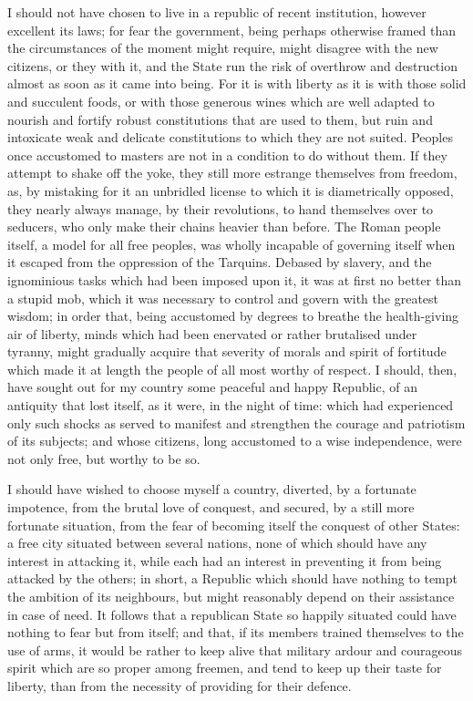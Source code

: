 \documentclass[12pt]{report}
\begin{document}
I should not have chosen to live in a republic of recent institution, however excellent its laws; for fear the government, being perhaps otherwise framed than the circumstances of the moment might require, might disagree with the new citizens, or they with it, and the State run the risk of overthrow and destruction almost as soon as it came into being. For it is with liberty as it is with those solid and succulent foods, or with those generous wines which are well adapted to nourish and fortify robust constitutions that are used to them, but ruin and intoxicate weak and delicate constitutions to which they are not suited. Peoples once accustomed to masters are not in a condition to do without them. If they attempt to shake off the yoke, they still more estrange themselves from freedom, as, by mistaking for it an unbridled license to which it is diametrically opposed, they nearly always manage, by their revolutions, to hand themselves over to seducers, who only make their chains heavier than before. The Roman people itself, a model for all free peoples, was wholly incapable of governing itself when it escaped from the oppression of the Tarquins. Debased by slavery, and the ignominious tasks which had been imposed upon it, it was at first no better than a stupid mob, which it was necessary to control and govern with the greatest wisdom; in order that, being accustomed by degrees to breathe the health-giving air of liberty, minds which had been enervated or rather brutalised under tyranny, might gradually acquire that severity of morals and spirit of fortitude which made it at length the people of all most worthy of respect. I should, then, have sought out for my country some peaceful and happy Republic, of an antiquity that lost itself, as it were, in the night of time: which had experienced only such shocks as served to manifest and strengthen the courage and patriotism of its subjects; and whose citizens, long accustomed to a wise independence, were not only free, but worthy to be so.

I should have wished to choose myself a country, diverted, by a fortunate impotence, from the brutal love of conquest, and secured, by a still more fortunate situation, from the fear of becoming itself the conquest of other States: a free city situated between several nations, none of which should have any interest in attacking it, while each had an interest in preventing it from being attacked by the others; in short, a Republic which should have nothing to tempt the ambition of its neighbours, but might reasonably depend on their assistance in case of need. It follows that a republican State so happily situated could have nothing to fear but from itself; and that, if its members trained themselves to the use of arms, it would be rather to keep alive that military ardour and courageous spirit which are so proper among freemen, and tend to keep up their taste for liberty, than from the necessity of providing for their defence.
\end{document}
